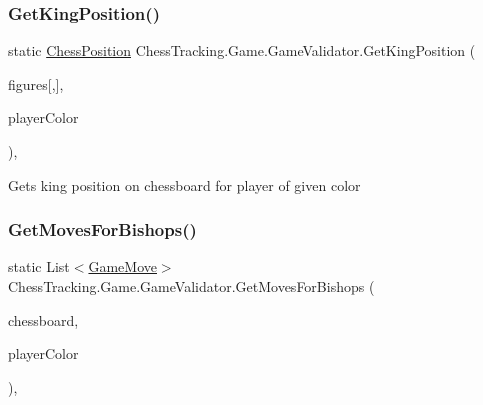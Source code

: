 \subsubsection{\texorpdfstring{GetKingPosition()}{GetKingPosition()}}
{\footnotesize\ttfamily static \mbox{\hyperlink{class_chess_tracking_1_1_game_1_1_chess_position}{Chess\+Position}} Chess\+Tracking.\+Game.\+Game\+Validator.\+Get\+King\+Position (\begin{DoxyParamCaption}\item[{\mbox{\hyperlink{class_chess_tracking_1_1_game_1_1_figure}{Figure}}}]{figures\mbox{[},\mbox{]},  }\item[{\mbox{\hyperlink{namespace_chess_tracking_1_1_game_ab79070a55977a8c8326e9cdda7dcfa9a}{Player\+Color}}}]{player\+Color }\end{DoxyParamCaption})\hspace{0.3cm}{\ttfamily [static]}, {\ttfamily [private]}}



Gets king position on chessboard for player of given color 

\mbox{\label{class_chess_tracking_1_1_game_1_1_game_validator_a72c7c0dabb399e9a15ff60faa7b7cba6}} 
\subsubsection{\texorpdfstring{GetMovesForBishops()}{GetMovesForBishops()}}
{\footnotesize\ttfamily static List$<$\mbox{\hyperlink{class_chess_tracking_1_1_game_1_1_game_move}{Game\+Move}}$>$ Chess\+Tracking.\+Game.\+Game\+Validator.\+Get\+Moves\+For\+Bishops (\begin{DoxyParamCaption}\item[{\mbox{\hyperlink{class_chess_tracking_1_1_game_1_1_chessboard_model}{Chessboard\+Model}}}]{chessboard,  }\item[{\mbox{\hyperlink{namespace_chess_tracking_1_1_game_ab79070a55977a8c8326e9cdda7dcfa9a}{Player\+Color}}}]{player\+Color }\end{DoxyParamCaption})\hspace{0.3cm}{\ttfamily [static]}, {\ttfamily [private]}}



